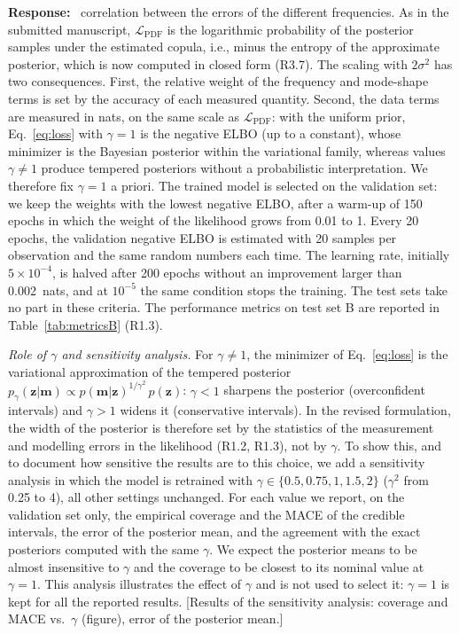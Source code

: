 \documentclass[11pt]{article}
\newenvironment{response}{\par\smallskip\noindent\color{resp}\textbf{Response:}\ }{\par}
\newcommand{\tbd}[1]{\textcolor{note}{\textsf{[#1]}}}
\newcommand{\m}{\mathbf{m}}
\newcommand{\z}{\mathbf{z}}
\begin{document}
\begin{response}
correlation between the errors of the different frequencies. As in the submitted manuscript, $\mathcal{L}_{\text{PDF}}$
is the logarithmic probability of the posterior samples under the estimated copula, i.e., minus the entropy of the
approximate posterior, which is now computed in closed form (R3.7). The scaling with $2\sigma^2$ has two consequences.
First, the relative weight of the frequency and mode-shape terms is set by the accuracy of each measured quantity.
Second, the data terms are measured in nats, on the same scale as
$\mathcal{L}_{\text{PDF}}$: with the uniform prior, Eq.~\eqref{eq:loss} with $\gamma=1$ is the negative ELBO (up to a
constant), whose minimizer is the Bayesian posterior within the variational family, whereas values $\gamma\neq1$
produce tempered posteriors without a probabilistic interpretation. We therefore fix $\gamma=1$ a priori. The trained model is selected on the validation set: we keep the weights with the
lowest negative ELBO, after a warm-up of 150 epochs in which the weight of the likelihood grows from 0.01 to 1. Every 20
epochs, the validation negative ELBO is estimated with 20 samples per observation and the same random numbers each time.
The learning rate, initially $5\times10^{-4}$, is halved after 200 epochs without an improvement larger than 0.002~nats,
and at $10^{-5}$ the same condition stops the training. 
The test sets take no part in these criteria. The performance metrics on test set B are reported in
Table~\ref{tab:metricsB} (R1.3).

\textit{Role of $\gamma$ and sensitivity analysis.} For $\gamma\neq1$, the minimizer of Eq.~\eqref{eq:loss} is the
variational approximation of the tempered posterior $p_\gamma(\z|\m)\propto p(\m|\z)^{1/\gamma^2}\,p(\z)$: $\gamma<1$ sharpens the posterior (overconfident intervals) and $\gamma>1$ widens it (conservative intervals).
In the revised formulation, the width of the posterior is therefore set by the statistics of the measurement and
modelling errors in the likelihood (R1.2, R1.3), not by $\gamma$. To show this, and to document how sensitive the
results are to this choice, we add a sensitivity analysis in which the model is retrained with
$\gamma\in\{0.5,0.75,1,1.5,2\}$ ($\gamma^2$ from 0.25 to 4), all other settings unchanged. For each value we report,
on the validation set only, the empirical coverage and the MACE of the credible intervals, the error of the posterior
mean, and the agreement with the exact posteriors computed with the same $\gamma$. We expect the posterior means to be
almost insensitive to $\gamma$ and the coverage to be closest to its nominal value at $\gamma=1$. This analysis
illustrates the effect of $\gamma$ and is not used to select it: $\gamma=1$ is kept for all the reported results.
\tbd{Results of the sensitivity analysis: coverage and MACE vs.\ $\gamma$ (figure), error of the posterior mean.}
\end{response}
\end{document}
